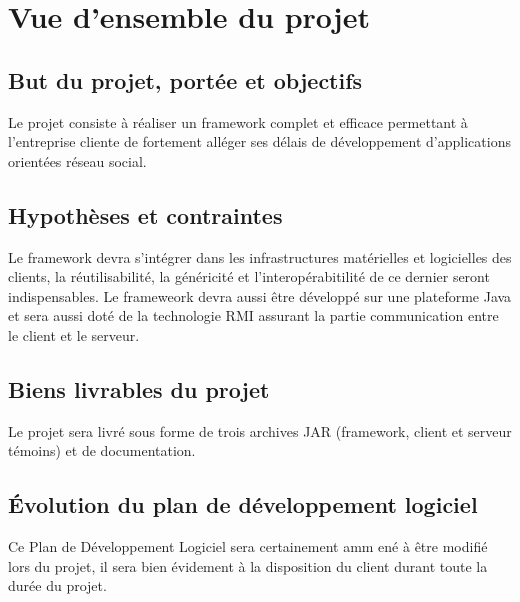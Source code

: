 
\section{Vue d’ensemble du projet}
\subsection{But du projet, portée et objectifs}
Le projet consiste à réaliser un framework complet et efficace permettant à l'entreprise cliente de fortement alléger ses délais de développement d'applications orientées réseau social.

\subsection{Hypothèses et contraintes}
Le framework devra s'intégrer dans les infrastructures matérielles et logicielles des clients, la réutilisabilité, la généricité et l'interopérabitilité de ce dernier seront indispensables.
Le frameweork devra aussi être développé sur une plateforme Java et sera aussi doté de la technologie RMI assurant la partie communication entre le client et le serveur.

\subsection{Biens livrables du projet}
Le projet sera livré sous forme de trois archives JAR (framework, client et serveur témoins) et de documentation.

\subsection{Évolution du plan de développement logiciel}
Ce Plan de Développement Logiciel sera certainement amm	ené à être modifié lors du projet, il sera bien évidement à la disposition du client durant toute la durée du projet.
